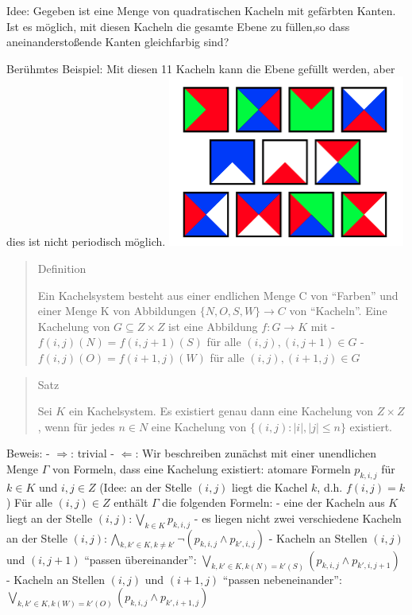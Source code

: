 \documentclass[a4paper]{article}
\begin{document}
\begin{multicols}{3}
  Idee: Gegeben ist eine Menge von quadratischen Kacheln mit gefärbten
  Kanten. Ist es möglich, mit diesen Kacheln die gesamte Ebene zu
  füllen,so dass aneinanderstoßende Kanten gleichfarbig sind?

  Berühmtes Beispiel: Mit diesen 11 Kacheln kann die Ebene gefüllt werden,
  aber dies ist nicht periodisch möglich.
  \includegraphics[width=\linewidth]{Assets/Logik-parkettierung-1.png}

  \begin{quote}
    Definition

    Ein Kachelsystem besteht aus einer endlichen Menge C von ``Farben'' und
    einer Menge K von Abbildungen $\{N,O,S,W\}\rightarrow C$ von
    ``Kacheln''. Eine Kachelung von $G\subseteq Z\times Z$ ist eine
    Abbildung $f:G\rightarrow K$ mit - $f(i,j)(N) =f(i,j+ 1 )(S)$ für alle
    $(i,j),(i,j+ 1 )\in G$ - $f(i,j)(O) =f(i+ 1 ,j)(W)$ für alle
    $(i,j),(i+ 1 ,j)\in G$
  \end{quote}

  \begin{quote}
    Satz

    Sei $K$ ein Kachelsystem. Es existiert genau dann eine Kachelung von
    $Z\times Z$, wenn für jedes $n\in N$ eine Kachelung von
    $\{(i,j) :|i|,|j| \leq n\}$ existiert.
  \end{quote}

  Beweis: - $\Rightarrow$: trivial - $\Leftarrow$: Wir beschreiben
  zunächst mit einer unendlichen Menge $\Gamma$ von Formeln, dass eine
  Kachelung existiert: atomare Formeln $p_{k,i,j}$ für $k\in K$ und
  $i,j\in Z$ (Idee: an der Stelle $(i,j)$ liegt die Kachel $k$, d.h.
  $f(i,j) =k$) Für alle $(i,j)\in Z$ enthält $\Gamma$ die folgenden
  Formeln: - eine der Kacheln aus $K$ liegt an der Stelle
  $(i,j):\bigvee_{k\in K} p_{k,i,j}$ - es liegen nicht zwei verschiedene
  Kacheln an der Stelle
  $(i,j): \bigwedge_{k,k'\in K,k\not=k'} \lnot(p_{k,i,j}\wedge p_{k',i,j})$
  - Kacheln an Stellen $(i,j)$ und $(i,j+1)$ ``passen übereinander'':
  $\bigvee_{k,k'\in K,k(N)=k'(S)} (p_{k,i,j}\wedge p_{k',i,j+1})$ -
  Kacheln an Stellen $(i,j)$ und $(i+1,j)$ ``passen nebeneinander'':
  $\bigvee_{k,k'\in K,k(W)=k'(O)} (p_{k,i,j}\wedge p_{k',i+1,j})$


\end{multicols}
\end{document}

